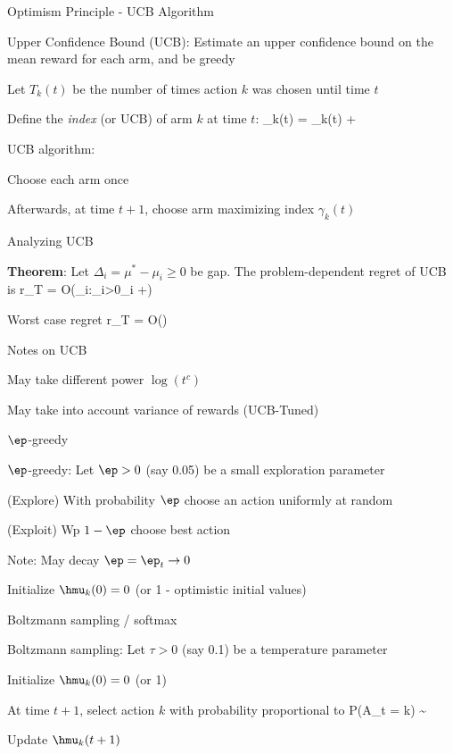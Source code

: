 \documentclass[english]{article}
\begin{document}
\item {Optimism Principle - UCB Algorithm}
\bitem 
\item Upper Confidence Bound (UCB): Estimate an upper confidence bound on the mean reward for each arm, and be greedy
\item Let $T_k(t)$ be the number of times action $k$ was chosen until time $t$
\item Define the \emph{index} (or UCB) of arm $k$ at time $t$:
\beqs
\gamma_{k}(t)  = \hmu_k(t) + 
\eeqs
\item UCB algorithm:
\benum
\item Choose each arm once
\item Afterwards, at time $t+1$, choose arm maximizing index $\gamma_{k}(t)$
\eenum
\eitem



\item {Analyzing UCB}
\bitem 
\item {\bf Theorem}: Let $\Delta_i = \mu^*-\mu_i\ge 0$ be gap. The problem-dependent regret of UCB is 
\beqs
r_T = O\left(\sum_{i:\Delta_i>0}\Delta_i +\right)
\eeqs
\item Worst case regret
\beqs
r_T  = O() 
\eeqs
\eitem



\item {Notes on UCB}
\bitem
\item May take different power $\log (t^c)$
\item May take into account variance of rewards (UCB-Tuned)
\eitem



\item {$\ep$-greedy}
\bitem 
\item $\ep$-greedy: Let $\ep>0$ (say 0.05) be a small exploration parameter
\benum
\item (Explore) With probability $\ep$ choose an action uniformly at random
\item (Exploit) Wp $1-\ep$ choose best action
\eenum
\item Note: May decay $\ep  = \ep_t \to 0$
\item Initialize $\hmu_k(0)=0$ (or 1 - optimistic initial values)
\eitem




\item {Boltzmann sampling / softmax}
\bitem 
\item Boltzmann sampling: Let $\tau>0$ (say 0.1) be a temperature parameter
\benum
\item Initialize $\hmu_k(0)=0$ (or 1)
\item At time $t+1$, select action $k$ with probability proportional to 
\beqs P(A_t = k) \sim \exp{}\eeqs
\item Update $\hmu_k(t+1)$
\eenum
\eitem
\end{document}
